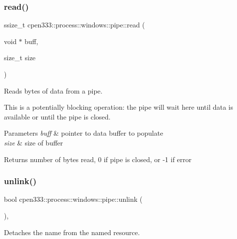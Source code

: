 \subsubsection{\texorpdfstring{read()}{read()}}
{\footnotesize\ttfamily ssize\+\_\+t cpen333\+::process\+::windows\+::pipe\+::read (\begin{DoxyParamCaption}\item[{void $\ast$}]{buff,  }\item[{size\+\_\+t}]{size }\end{DoxyParamCaption})\hspace{0.3cm}{\ttfamily [inline]}}



Reads bytes of data from a pipe. 

This is a potentially blocking operation\+: the pipe will wait here until data is available or until the pipe is closed.


\begin{DoxyParams}{Parameters}
{\em buff} & pointer to data buffer to populate \\
\hline
{\em size} & size of buffer \\
\hline
\end{DoxyParams}
\begin{DoxyReturn}{Returns}
number of bytes read, 0 if pipe is closed, or -\/1 if error 
\end{DoxyReturn}
\mbox{\label{classcpen333_1_1process_1_1windows_1_1pipe_abe0bc707040aa7e82ed41c26cc4c93c1}} 
\subsubsection{\texorpdfstring{unlink()}{unlink()}\hspace{0.1cm}{\footnotesize\ttfamily [1/2]}}
{\footnotesize\ttfamily bool cpen333\+::process\+::windows\+::pipe\+::unlink (\begin{DoxyParamCaption}{ }\end{DoxyParamCaption})\hspace{0.3cm}{\ttfamily [inline]}, {\ttfamily [virtual]}}



Detaches the name from the named resource. 

